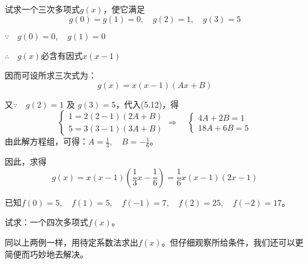 \begin{example}
试求一个三次多项式$g(x)$，使它满足
\[g (0) =g (1) =0,\quad g (2) =1,\quad g (3) =5\]
\end{example}

\begin{solution}
    $\because\quad g(0)=0,\quad g(1)=0$

$\therefore\quad g(x)$必含有因式$x(x-1)$

因而可设所求三次式为：
\begin{equation}
    g (x) =x (x-1) (Ax+B)
\end{equation}

又$\because\quad g(2)=1$ 及 $g(3)=5$，代入(5.12)，得 
\[\begin{cases}
    1=2(2-1)(2A+B)\\
    5=3(3-1)(3A+B)
\end{cases}\Rightarrow\quad \begin{cases}
    4A+2B=1\\
    18A+6B=5
\end{cases}\]
由此解方程组，可得：$A=\frac{1}{3},\quad B=-\frac{1}{6}$。

因此，求得
\[g(x)=x(x-1)\left(\frac{1}{3}x-\frac{1}{6}\right)=\frac{1}{6}x(x-1)(2x-1)\]
\end{solution}

\begin{example}
已知$f(0)=5,\quad f(1)=5,\quad f(-1)=7,\quad f(2)=25,\quad f(-2)=17$。

试求：一个四次多项式$f (x)$。
\end{example}

\begin{note}
同以上两例一样，用待定系数法求出$f(x)$。但仔细观察所给条件，我们还可以更简便而巧妙地去解决。
\end{note}

